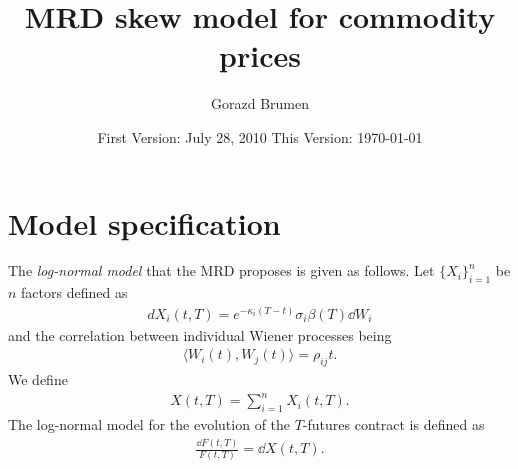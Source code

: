\documentclass[12pt]{article}
\title{{\bf MRD skew model for commodity prices}}
\author{Gorazd Brumen}
\date{First Version: July 28, 2010 
  \vskip 1mm
  This Version: \today
}
\begin{document}
\maketitle

\section {Model specification}

The {\it log-normal model} that the MRD proposes is given as follows. 
Let $\{ X_i \}_{i=1}^n$ be $n$ factors defined as 
\begin {eqnarray*}
  dX_i (t,T) = e^{-\kappa_i  (T - t) } \sigma_i \beta (T) \dd W_i 
\end {eqnarray*}
and the correlation between individual Wiener processes being 
\begin {eqnarray*}
  \langle W_i (t), W_j (t) \rangle = \rho_{ij} t .
\end {eqnarray*}
We define 
\begin {eqnarray}
  X(t,T) = \sum_{i=1}^n X_i (t,T).
  \label {factors}
\end {eqnarray}
The log-normal model for the evolution of the $T$-futures contract 
is defined as 
\begin {eqnarray}
  \frac {\dd F(t,T)} {F(t,T)} = \dd X(t,T).
  \label {F_lognormal}
\end {eqnarray}
\end{document}
